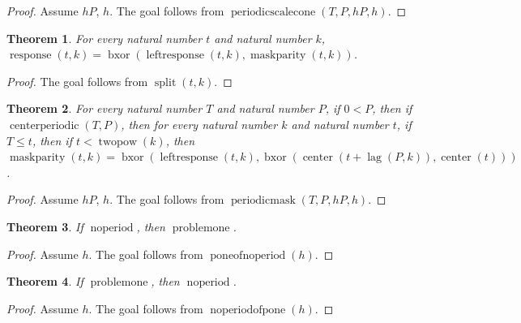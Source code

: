 \documentclass[11pt]{article}
\newtheorem{theorem}{Theorem}[section]
\theoremstyle{definition}
\begin{document}
\begin{proof}
Assume \(hP\), \(h\).
The goal follows from \(\operatorname{periodicscalecone}(T, P, hP, h)\).
\end{proof}
\begin{theorem}
\label{ll:paper:response-split}
For every natural number \(t\) and natural number \(k\), \(\operatorname{response}(t, k) = \operatorname{bxor}(\operatorname{leftresponse}(t, k), \operatorname{maskparity}(t, k))\).
\end{theorem}
\begin{proof}
The goal follows from \(\operatorname{split}(t, k)\).
\end{proof}
\begin{theorem}
\label{ll:paper:periodic-mask}
For every natural number \(T\) and natural number \(P\), if \(0 < P\), then if \(\operatorname{centerperiodic}(T, P)\), then for every natural number \(k\) and natural number \(t\), if \(T \le t\), then if \(t < \operatorname{twopow}(k)\), then \(\operatorname{maskparity}(t, k) = \operatorname{bxor}(\operatorname{leftresponse}(t, k), \operatorname{bxor}(\operatorname{center}(t + \operatorname{lag}(P, k)), \operatorname{center}(t)))\).
\end{theorem}
\begin{proof}
Assume \(hP\), \(h\).
The goal follows from \(\operatorname{periodicmask}(T, P, hP, h)\).
\end{proof}
\begin{theorem}
\label{ll:paper:noperiod-sufficient}
If \(\operatorname{noperiod}\), then \(\operatorname{problemone}\).
\end{theorem}
\begin{proof}
Assume \(h\).
The goal follows from \(\operatorname{poneofnoperiod}(h)\).
\end{proof}
\begin{theorem}
\label{ll:paper:noperiod-necessary}
If \(\operatorname{problemone}\), then \(\operatorname{noperiod}\).
\end{theorem}
\begin{proof}
Assume \(h\).
The goal follows from \(\operatorname{noperiodofpone}(h)\).
\end{proof}
\end{document}

